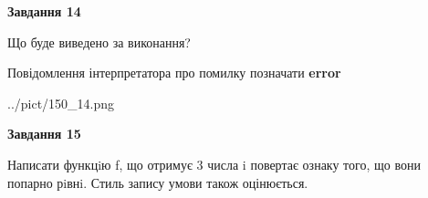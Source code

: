 \documentclass[11pt, ukrainian]{article}
\begin{document}
{\begin {large}
{\begin {center}\textbf{Завдання 14}\end {center}}\par
Що буде виведено за виконання? \par
Повідомлення інтерпретатора про помилку позначати \textbf{error}

\begin{center}
	{../pict/150_14.png}
\end{center}
\newpage

{\begin {center}\textbf{Завдання 15}\end {center}}\par

Написати функцiю f, що отримує 3 числа i повертає ознаку того, що вони попарно рiвнi. Стиль запису умови також оцінюється.\par
\newpage

\end {large}}
\end{document}
